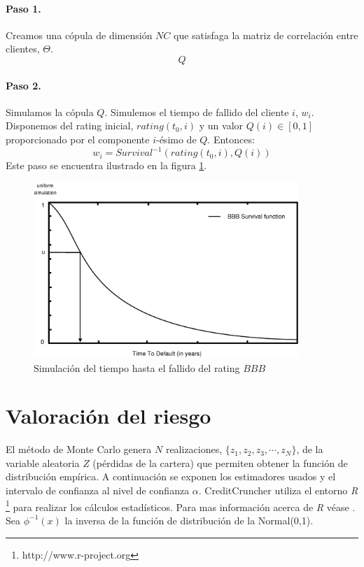 \paragraph{Paso 1.} Creamos una c\'opula de dimensi\'on $NC$ que satisfaga la
matriz de correlaci\'on entre clientes, $\Theta$.
\begin{displaymath}
Q
\end{displaymath}

\paragraph{Paso 2.} Simulamos la c\'opula $Q$. Simulemos el tiempo de fallido del
cliente $i$, $w_i$. Disponemos del rating inicial, $rating(t_0,i)$ y un valor
$Q(i) \in [0,1]$ proporcionado por el componente $i$-\'esimo de $Q$. Entonces:
\begin{displaymath}
w_i = Survival^{-1}(rating(t_0,i),Q(i))
\end{displaymath}
Este paso se encuentra ilustrado en la figura \ref{simttd}.

\begin{figure}[!hb]
\begin{center}
\includegraphics[width=10cm,angle=0]{./images/simttd.eps}
\caption{Simulaci\'on del tiempo hasta el fallido del rating $BBB$}
\label{simttd}
\end{center}
\end{figure}



\section{Valoraci\'on del riesgo}
\label{res:risk}

El m\'etodo de Monte Carlo genera $N$ realizaciones, $\{z_1,z_2,z_3,\cdots,z_N\}$,
de la variable aleatoria $Z$ (p\'erdidas de la cartera) que permiten obtener la
funci\'on de distribuci\'on emp\'irica. A continuaci\'on se exponen los estimadores
usados y el intervalo de confianza al nivel de confianza $\alpha$. CreditCruncher
utiliza el entorno \emph{R} \footnote{http://www.r-project.org} para realizar los
c\'alculos estad\'isticos. Para mas informaci\'on acerca de \emph{R} v\'ease \cite{stats:R}.
Sea $\phi^{-1}(x)$ la inversa de la funci\'on de distribuci\'on de la Normal(0,1).

